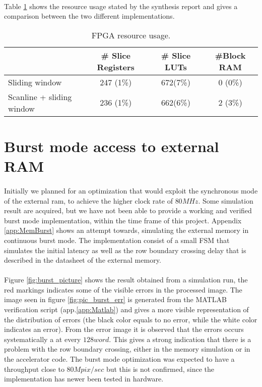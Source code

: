 \paragraph*{}
Table \ref{tab:FPGAresourceUse} shows the resource usage stated by the synthesis report and gives a comparison between the two different implementations.
\begin{table}[h]
	\centering
	\begin{tabular}{lccc}
	\hline
	 							& \# Slice Registers	& \# Slice LUTs	& \#Block RAM 	 \\ \hline
	Sliding window				& 247 (1\%)				& 672(7\%) 		& 0 (0\%) \\
	Scanline + sliding window	& 236 (1\%)				& 662(6\%)		& 2 (3\%)  \\
	\end{tabular}
	\caption{FPGA resource usage.}
	\label{tab:FPGAresourceUse}
\end{table}

\section{Burst mode access to external RAM}
\paragraph*{}
Initially we planned for an optimization that would exploit the synchronous mode of the external ram, to achieve the higher clock rate of $80MHz$. Some simulation result are acquired, but we have not been able to provide a working and verified burst mode implementation, within the time frame of this project. Appendix \ref{app:MemBurst} shows an attempt towards, simulating the external memory in continuous burst mode. The implementation consist of a small FSM that simulates the initial latency as well as the row boundary crossing delay that is described in the datasheet \cite{Micron:CellularRAM} of the external memory.
\paragraph*{}
Figure \ref{fig:burst_picture} shows the result obtained from a simulation run, the red markings indicates some of the visible errors in the processed image. The image seen in figure \ref{fig:pic_burst_err} is generated from the MATLAB verification script (app.\ref{app:Matlab}) and gives a more visible representation of the distribution of errors (the black color equals to no error, while the white color indicates an error). From the error image it is observed that the errors occurs systematically a at every $128word$. This gives a strong indication that there is a problem with the row boundary crossing, either in the memory simulation or in the accelerator code.  The burst mode optimization was expected to have a throughput close to $80M pix/sec$ but this is not confirmed, since the implementation has newer been tested in hardware.
     
